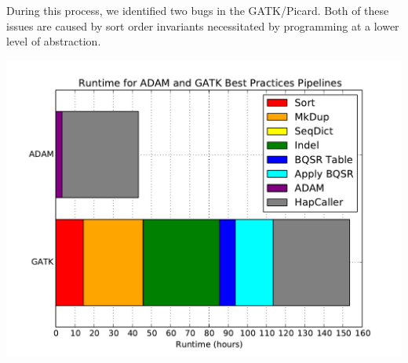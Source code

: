 \documentclass[11pt]{a0poster}
\begin{document}
{\begin{minipage}[t][2045pt][t]{\linewidth}
\begin{minipage}{0.6\linewidth}
\begin{minipage}{\linewidth}
{\begin{minipage}[t][590pt][t]{\linewidth}
\begin{minipage}{0.55\linewidth}
During this process, we identified two bugs in the GATK/Picard.
Both of these issues are caused by sort order invariants necessitated by
programming at a lower level of abstraction.
\end{minipage}
\begin{minipage}{0.03\linewidth}
\hfill
\pagebreak
\end{minipage}
\begin{minipage}{0.4\linewidth}
\color{Blue}
\begin{center}
\end{center}
\color{Blue}
\begin{center}
\includegraphics[width=0.9\linewidth]{perf.pdf}
\end{center}
\end{minipage}
\end{minipage}
}
\end{minipage}
\end{minipage}
\end{minipage}
}
\end{document}
